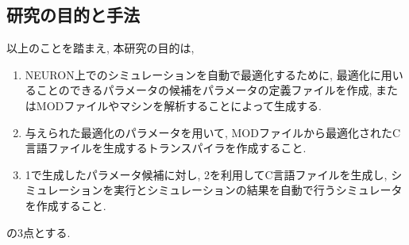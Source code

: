 \subsection{研究の目的と手法}
以上のことを踏まえ, 本研究の目的は,
\begin{enumerate}
\item NEURON上でのシミュレーションを自動で最適化するために, 最適化に用いることのできるパラメータの候補をパラメータの定義ファイルを作成, またはMODファイルやマシンを解析することによって生成する.
\item 与えられた最適化のパラメータを用いて, MODファイルから最適化されたC言語ファイルを生成するトランスパイラを作成すること.
\item 1で生成したパラメータ候補に対し, 2を利用してC言語ファイルを生成し, シミュレーションを実行とシミュレーションの結果を自動で行うシミュレータを作成すること.
\end{enumerate}
の3点とする.
